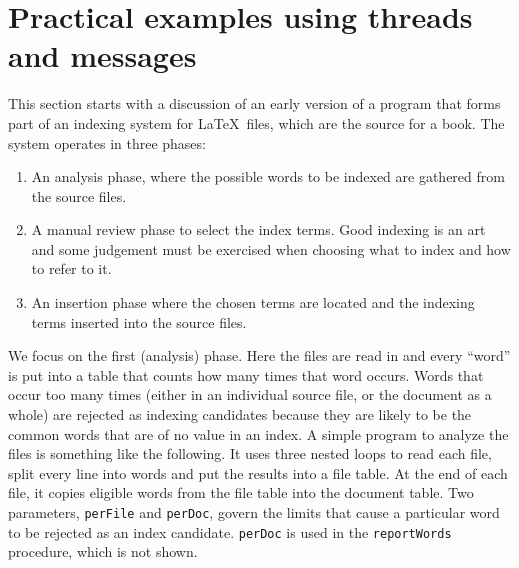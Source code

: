\section{Practical examples using threads and messages}
This section starts with a discussion of an early version of a program that
forms part of an indexing system for \LaTeX\ files, which are the source for a
book.  The system operates in three phases:
\begin{enumerate}
\item An analysis phase, where the possible words to be indexed are gathered
      from the source files.
\item A manual review phase to select the index terms. Good indexing
      is an art and some judgement must be exercised when choosing
      what to index and how to refer to it.
\item An insertion phase where the chosen terms are located and the indexing
      terms inserted into the source files.
\end{enumerate}
We focus on the first (analysis) phase. Here the files are read in and every
``word'' is put into a table that counts how many times that word occurs. 
Words that occur too many times (either in an individual source file, or the
document as a whole) are rejected as indexing candidates because they are likely
to be the common words that are of no value in an index.
A simple program to analyze the files is something like the following. It uses
three nested loops to read each file, split every line into words and put the
results into a file table. At the end of each file, it copies eligible words from
the file table into the document table.
Two parameters, \texttt{perFile} and \texttt{perDoc}, govern the limits that cause
a particular word to be rejected as an index candidate. \texttt{perDoc} is used
in the \texttt{reportWords} procedure, which is not shown.

